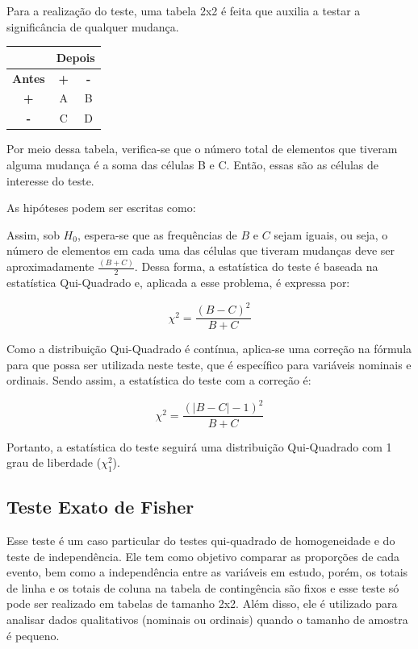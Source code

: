 \documentclass[
]{estat/estat}
\begin{document}
Para a realização do teste, uma tabela 2x2 é feita que auxilia a testar
a significância de qualquer mudança.

\begin{table}[H]
\centering
\begin{tabular}{c|cc}
\multicolumn{1}{l|}{} & \multicolumn{2}{c}{\textbf{Depois}} \\ 
\midrule
\textbf{Antes}  &\textbf{+} & \textbf{-}    \\ 
\midrule
\textbf{+}      & A         & B     \\
\textbf{-}      & C         & D               
\end{tabular}
\end{table}

Por meio dessa tabela, verifica-se que o número total de elementos que
tiveram alguma mudança é a soma das células B e C. Então, essas são as
células de interesse do teste.

As hipóteses podem ser escritas como:


Assim, sob \(H_{0}\), espera-se que as frequências de \(B\) e \(C\)
sejam iguais, ou seja, o número de elementos em cada uma das células que
tiveram mudanças deve ser aproximadamente
\(\displaystyle\frac{(B + C)}{2}\). Dessa forma, a estatística do teste
é baseada na estatística Qui-Quadrado e, aplicada a esse problema, é
expressa por:

\[ \chi^{2} = \frac{(B - C)^{2}}{B + C} \]

Como a distribuição Qui-Quadrado é contínua, aplica-se uma correção na
fórmula para que possa ser utilizada neste teste, que é específico para
variáveis nominais e ordinais. Sendo assim, a estatística do teste com a
correção é:

\[ \chi^{2} = \frac{(|B - C| - 1)^{2}}{B + C} \]

Portanto, a estatística do teste seguirá uma distribuição Qui-Quadrado
com 1 grau de liberdade (\(\chi_{1}^{2}\)).

\subsection{Teste Exato de Fisher}\label{teste-exato-de-fisher}

Esse teste é um caso particular do testes qui-quadrado de homogeneidade
e do teste de independência. Ele tem como objetivo comparar as
proporções de cada evento, bem como a independência entre as variáveis
em estudo, porém, os totais de linha e os totais de coluna na tabela de
contingência são fixos e esse teste só pode ser realizado em tabelas de
tamanho 2x2. Além disso, ele é utilizado para analisar dados
qualitativos (nominais ou ordinais) quando o tamanho de amostra é
pequeno.
\end{document}

